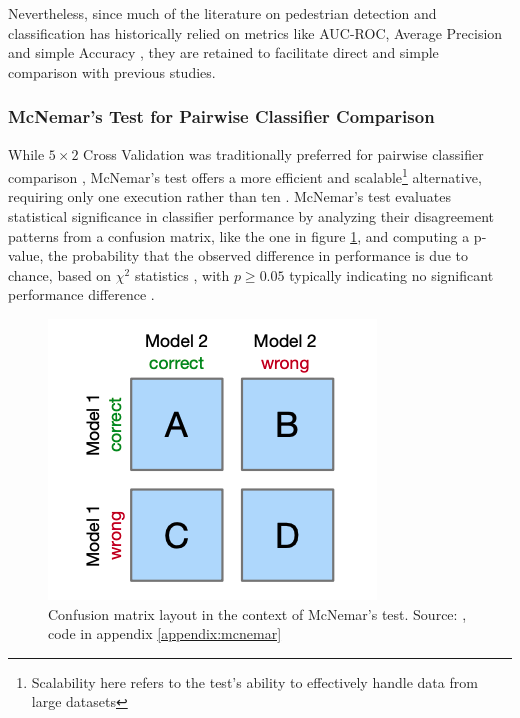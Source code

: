 Nevertheless, since much of the literature on pedestrian detection and classification has historically relied on metrics like AUC-ROC, Average Precision and simple Accuracy \cite{dalal_2005_histograms} \cite{dollar_2012_pedestrian}, they are retained to facilitate direct and simple comparison with previous studies.

\subsubsection{McNemar's Test for Pairwise Classifier Comparison}

While $5 \times 2$ Cross Validation was traditionally preferred for pairwise classifier comparison \cite{dietterich_1998_mcnemar}, McNemar's test offers a more efficient and scalable\footnote{Scalability here refers to the test's ability to effectively handle data from large datasets} alternative, requiring only one execution rather than ten \cite{raschka_2018_mcnemar}. McNemar's test evaluates statistical significance in classifier performance by analyzing their disagreement patterns from a confusion matrix, like the one in figure \ref{fig:confusion_mcnemar}, and computing a p-value, the probability that the observed difference in performance is due to chance, based on $\chi^{2}$ statistics \cite{dietterich_1998_mcnemar}, with $p \ge 0.05$ typically indicating no significant performance difference \cite{raschka_2018_mcnemar} \cite{dietterich_1998_mcnemar}.

\begin{figure}
    \centering
    \includegraphics[width=0.5\linewidth]{images/mcnemar_matrix.png}
    \caption{Confusion matrix layout in the context of McNemar's test. Source: \cite{raschka_2018_mcnemar}, code in appendix \ref{appendix:mcnemar}}
    \label{fig:confusion_mcnemar}
\end{figure}


